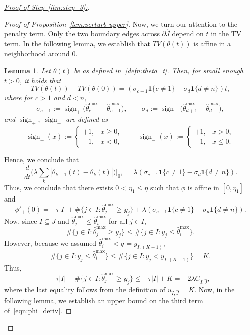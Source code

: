 \documentclass[11pt]{article}
\newcommand{\one}{\mathbf 1}
\theoremstyle{plain}
\newtheorem{lemma}[theorem]{Lemma}
\theoremstyle{definition}
\theoremstyle{remark}
\begin{document}
\begin{proof}[\underline{Proof of Step~\ref{itm:step_3}:}]
\begin{itemize}
\begin{proof}[Proof of Proposition~\ref{lem:perturb-upper}]
Now, we turn our attention to the penalty term. Only the two boundary edges across $\partial \hat{J}$ depend on $t$ in the TV term. In the following lemma, we establish that $TV(\theta(t))$ is affine in a neighborhood around $0$.
\begin{lemma}\label{lemma:TV_is_affine}
    Let $\theta(t)$ be as defined in~\eqref{defn:theta_t}. Then, for small enough $t>0$, it holds that
    \begin{equation}\label{eqn:penalty_term_is_affine}
    TV(\theta(t))-TV(\theta(0))=(\sigma_{c-1}\one\{c\neq 1\}-\sigma_d\one\{d\neq n\})t,
\end{equation}
where for $c>1$ and $d<n$,
\[
\sigma_{c-1}:=\operatorname{sign}_+\bigl(\hat\theta^{\max}_c-\hat\theta^{\max}_{c-1}\bigr),
\qquad
\sigma_d:=\operatorname{sign}_-\bigl(\hat\theta^{\max}_{d+1}-\hat\theta^{\max}_d\bigr),
\]
and $\operatorname{sign}_+,\;\operatorname{sign}_-$ are defined as
\[
\operatorname{sign}_+(x):=
\begin{cases}
+1,& x\ge 0,\\
-1,& x<0,
\end{cases}
\qquad
\operatorname{sign}_-(x):=
\begin{cases}
+1,& x>0,\\
-1,& x\le 0.
\end{cases}
\]
\end{lemma}
Hence, we conclude that
\[\frac{d}{dt}\Big(\lambda\sum_{k}|\theta_{k+1}(t)-\theta_k(t)|\Big)\Big|_{0^+}
=
\lambda(\sigma_{c-1}\one\{c\neq 1\}-\sigma_d\one\{d\neq n\}).\]
Thus, we conclude that there exists $0<\eta_1\leq \eta$ such that $\phi$ is affine in $[0,\eta_1]$ and 
\begin{equation}\label{eqn:phi_deriv}
    \phi'_+(0)=-\tau|I|+\#\{j\in I:\hat\theta^{\max}_j\ge y_j\}+\lambda(\sigma_{c-1}\one\{c\neq 1\}-\sigma_d\one\{d\neq n\}).
\end{equation}
Now, since $I\subseteq J$ and $\hat\theta^{\max}_j\le\hat\theta^{\max}_i$ for all $j\in I$,
\[
\#\{j\in I:\hat\theta^{\max}_j\ge y_j\}
\le
\#\{j\in I:y_j\le \hat\theta_i^{\max}\}.
\]
However, because we assumed $\hat\theta_i^{\max}<q=y_{I,(K+1)}$,
\[
\#\{j\in I:y_j\le \hat\theta_i^{\max}\}\le \#\{j\in I:y_j< y_{I,(K+1)}\}= K.
\]
Thus,
\begin{equation}\label{eq:data-bound-full}
-\tau|I|
+\#\{j\in I:\hat\theta^{\max}_j\ge y_j\}
\leq
-\tau|I|+K
=
-2\lambda C_{I,\hat{J}},
\end{equation}
where the last equality follows from the definition of $u_{I,\hat{J}}=K.$
Now, in the following lemma, we establish an upper bound on the third term of~\eqref{eqn:phi_deriv}.

\end{proof}
\end{itemize}
\end{proof}
\end{document}

